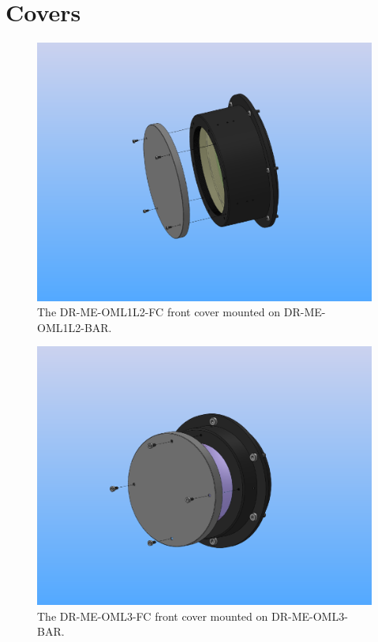 \documentclass{article}
\begin{document}
\clearpage
\section{Covers}

\begin{figure}[p]
\begin{center}
\includegraphics[width=0.7\linewidth]{figures/DR-ME-OML1L2-FC-EXV.PDF}
\end{center}
\caption{The DR-ME-OML1L2-FC front cover mounted on DR-ME-OML1L2-BAR.}
\label{figure:oml1l2-fc}
\end{figure}

\begin{figure}[p]
\begin{center}
\includegraphics[width=0.7\linewidth]{figures/DR-ME-OML3-FC-EXV.PDF}
\end{center}
\caption{The DR-ME-OML3-FC front cover mounted on DR-ME-OML3-BAR.}
\label{figure:oml3-fc}
\end{figure}
\end{document}
